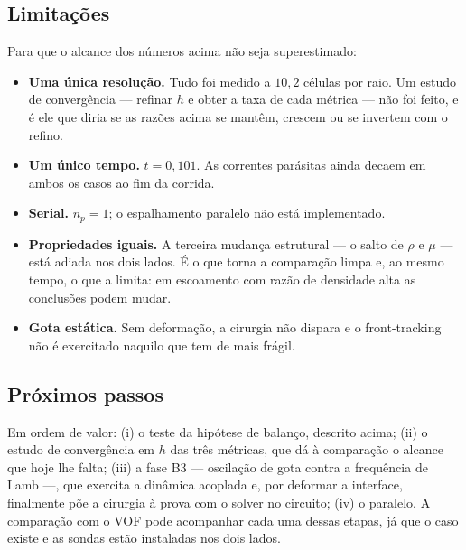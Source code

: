 \subsection{Limita\c{c}\~oes}

Para que o alcance dos n\'umeros acima n\~ao seja superestimado:

\begin{itemize}
  \item \textbf{Uma \'unica resolu\c{c}\~ao.} Tudo foi medido a $10{,}2$
    c\'elulas por raio. Um estudo de converg\^encia --- refinar $h$ e obter a
    taxa de cada m\'etrica --- n\~ao foi feito, e \'e ele que diria se as
    raz\~oes acima se mant\^em, crescem ou se invertem com o refino.
  \item \textbf{Um \'unico tempo.} $t=0{,}101$. As correntes par\'asitas ainda
    decaem em ambos os casos ao fim da corrida.
  \item \textbf{Serial.} $n_p=1$; o espalhamento paralelo n\~ao est\'a
    implementado.
  \item \textbf{Propriedades iguais.} A terceira mudan\c{c}a estrutural --- o
    salto de $\rho$ e $\mu$ --- est\'a adiada nos dois lados. \'E o que torna a
    compara\c{c}\~ao limpa e, ao mesmo tempo, o que a limita: em escoamento com
    raz\~ao de densidade alta as conclus\~oes podem mudar.
  \item \textbf{Gota est\'atica.} Sem deforma\c{c}\~ao, a cirurgia n\~ao dispara e
    o front-tracking n\~ao \'e exercitado naquilo que tem de mais fr\'agil.
\end{itemize}

\subsection{Pr\'oximos passos}

Em ordem de valor: (i) o teste da hip\'otese de balan\c{c}o, descrito acima;
(ii) o estudo de converg\^encia em $h$ das tr\^es m\'etricas, que d\'a \`a
compara\c{c}\~ao o alcance que hoje lhe falta; (iii) a fase B3 --- oscila\c{c}\~ao
de gota contra a frequ\^encia de Lamb ---, que exercita a din\^amica acoplada e,
por deformar a interface, finalmente p\~oe a cirurgia \`a prova com o solver no
circuito; (iv) o paralelo. A compara\c{c}\~ao com o VOF pode acompanhar cada uma
dessas etapas, j\'a que o caso existe e as sondas est\~ao instaladas nos dois
lados.
